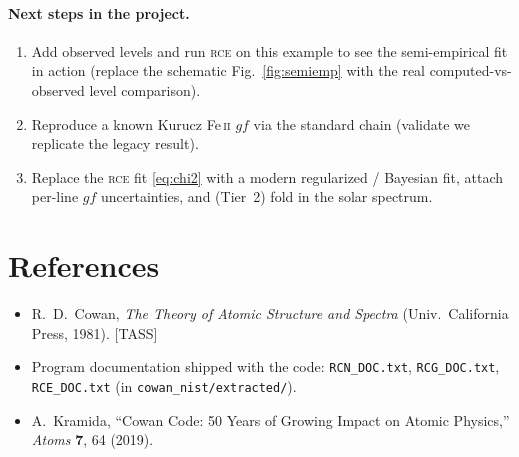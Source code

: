 \documentclass[11pt]{article}
\newcommand{\prog}[1]{\textsc{#1}}
\newcommand{\file}[1]{\texttt{#1}}
\begin{document}
\paragraph{Next steps in the project.}
\begin{enumerate}[nosep]
\item Add observed levels and run \prog{rce} on this example to see the
semi-empirical fit in action (replace the schematic Fig.~\ref{fig:semiemp} with
the real computed-vs-observed level comparison).
\item Reproduce a known Kurucz Fe\,\textsc{ii} $gf$ via the standard chain
(validate we replicate the legacy result).
\item Replace the \prog{rce} fit \eqref{eq:chi2} with a modern regularized /
Bayesian fit, attach per-line $gf$ uncertainties, and (Tier~2) fold in the
solar spectrum.
\end{enumerate}

\section*{References}
\begin{itemize}[nosep]
\item R.~D.\ Cowan, \emph{The Theory of Atomic Structure and Spectra}
(Univ.\ California Press, 1981). [TASS]
\item Program documentation shipped with the code:
\file{RCN\_DOC.txt}, \file{RCG\_DOC.txt}, \file{RCE\_DOC.txt}
(in \file{cowan\_nist/extracted/}).
\item A.\ Kramida, ``Cowan Code: 50 Years of Growing Impact on Atomic Physics,''
\emph{Atoms} \textbf{7}, 64 (2019).
\end{itemize}
\end{document}
